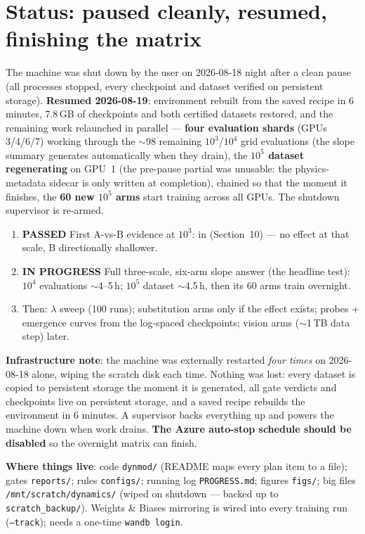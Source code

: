 \documentclass[10pt]{article}
\newcommand{\pass}{\textcolor{green!50!black}{\textbf{PASSED}}}
\newcommand{\open}{\textcolor{orange!80!black}{\textbf{IN PROGRESS}}}
\begin{document}
\section{Status: paused cleanly, resumed, finishing the matrix}
The machine was shut down by the user on 2026-08-18 night after a clean pause
(all processes stopped, every checkpoint and dataset verified on persistent
storage). \textbf{Resumed 2026-08-19}: environment rebuilt from the saved
recipe in 6 minutes, 7.8\,GB of checkpoints and both certified datasets
restored, and the remaining work relaunched in parallel --- \textbf{four
evaluation shards} (GPUs 3/4/6/7) working through the $\sim$98 remaining
$10^3$/$10^4$ grid evaluations (the slope summary generates automatically when
they drain), the \textbf{$10^5$ dataset regenerating} on GPU~1 (the pre-pause
partial was unusable: the physics-metadata sidecar is only written at
completion), chained so that the moment it finishes, the \textbf{60 new
$10^5$ arms} start training across all GPUs. The shutdown supervisor is
re-armed.

\begin{enumerate}[leftmargin=1.6em,itemsep=0.1em]
\item \pass{} First A-vs-B evidence at $10^3$: in (Section~10) --- no effect
at that scale, B directionally shallower.
\item \open{} Full three-scale, six-arm slope answer (the headline test):
$10^4$ evaluations $\sim$4--5\,h; $10^5$ dataset $\sim$4.5\,h, then its 60
arms train overnight.
\item Then: $\lambda$ sweep (100 runs); substitution arms only if the effect
exists; probes + emergence curves from the log-spaced checkpoints; vision arms
($\sim$1\,TB data step) later.
\end{enumerate}

\textbf{Infrastructure note}: the machine was externally restarted \emph{four
times} on 2026-08-18 alone, wiping the scratch disk each time. Nothing was lost:
every dataset is copied to persistent storage the moment it is generated, all
gate verdicts and checkpoints live on persistent storage, and a saved recipe
rebuilds the environment in 6 minutes. A supervisor backs everything up and
powers the machine down when work drains. \textbf{The Azure auto-stop schedule
should be disabled} so the overnight matrix can finish.

\textbf{Where things live}: code \texttt{dynmod/} (README maps every plan item to a
file); gates \texttt{reports/}; rules \texttt{configs/}; running log
\texttt{PROGRESS.md}; figures \texttt{figs/}; big files
\texttt{/mnt/scratch/dynamics/} (wiped on shutdown --- backed up to
\texttt{scratch\_backup/}). Weights \& Biases mirroring is wired into every
training run (\texttt{--track}); needs a one-time \texttt{wandb login}.
\end{document}
